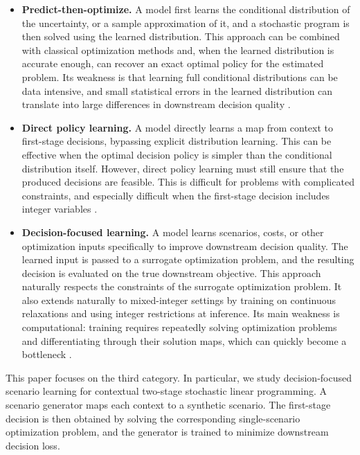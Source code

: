\begin{itemize}
    \item \textbf{Predict-then-optimize.} A model first learns the conditional distribution of the uncertainty, or a sample approximation of it, and a stochastic program is then solved using the learned distribution. This approach can be combined with classical optimization methods and, when the learned distribution is accurate enough, can recover an exact optimal policy for the estimated problem. Its weakness is that learning full conditional distributions can be data intensive, and small statistical errors in the learned distribution can translate into large differences in downstream decision quality \citep{placeholder_predict_then_optimize_sp,placeholder_statistical_error_decision_quality}.

    \item \textbf{Direct policy learning.} A model directly learns a map from context to first-stage decisions, bypassing explicit distribution learning. This can be effective when the optimal decision policy is simpler than the conditional distribution itself. However, direct policy learning must still ensure that the produced decisions are feasible. This is difficult for problems with complicated constraints, and especially difficult when the first-stage decision includes integer variables \citep{placeholder_direct_policy_learning,placeholder_feasible_neural_policies,placeholder_integer_constraints_learning}.

    \item \textbf{Decision-focused learning.} A model learns scenarios, costs, or other optimization inputs specifically to improve downstream decision quality. The learned input is passed to a surrogate optimization problem, and the resulting decision is evaluated on the true downstream objective. This approach naturally respects the constraints of the surrogate optimization problem. It also extends naturally to mixed-integer settings by training on continuous relaxations and using integer restrictions at inference. Its main weakness is computational: training requires repeatedly solving optimization problems and differentiating through their solution maps, which can quickly become a bottleneck \citep{placeholder_decision_focused_learning_overview,placeholder_dfl_stochastic_programming}.
\end{itemize}

This paper focuses on the third category. In particular, we study decision-focused scenario learning for contextual two-stage stochastic linear programming. A scenario generator maps each context to a synthetic scenario. The first-stage decision is then obtained by solving the corresponding single-scenario optimization problem, and the generator is trained to minimize downstream decision loss.

